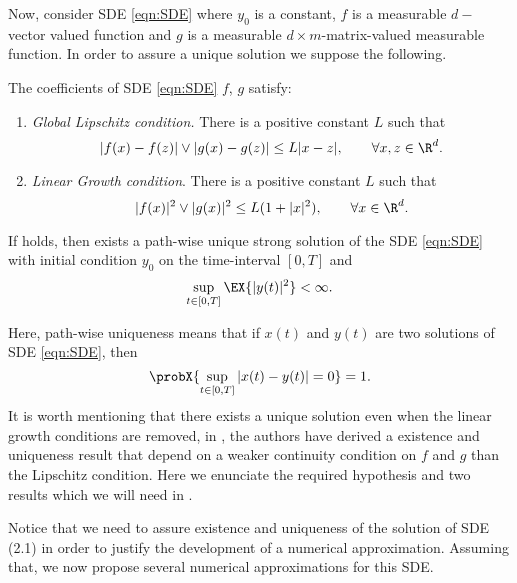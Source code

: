 Now,  consider SDE \eqref{eqn:SDE} where $y_0$ is a constant, $f$ is a measurable
$d-$vector valued function and $g$ is a measurable $d\times m$-matrix-valued measurable function.
In order to assure a unique solution we suppose the following.
\begin{hypothesis}\label{ass:ClassicExisAndUniqueness}
		The coefficients of SDE \eqref{eqn:SDE} $f$, $g$ satisfy: 
	\begin{enumerate}[(EU1)]
		\item \emph{Global Lipschitz condition.}
			There is a positive constant $L$ such that
			$$
				|f(x)-f(z)| \vee |g(x)-g(z)|\leq L|x-z|, \qquad \forall x,z \in \R^d.
			$$
		\item \emph{Linear Growth condition}. There is a positive constant $L$ such that
			$$
				|f(x)|^ 2 \vee |g(x)|^ 2 \leq L(1+|x|^2), \qquad \forall x \in \R^d.
			$$
	\end{enumerate}
\end{hypothesis}
\begin{thm}
	If  holds, then exists a path-wise unique strong solution of the SDE
	\eqref{eqn:SDE} with initial condition $y_0$ on the time-interval $[0, T]$ and
	\begin{equation}
		\sup_{t\in [0,T]} \EX{|y(t)|^2} < \infty.
	\end{equation}
\end{thm}
	Here, path-wise uniqueness means that if $x(t)$ and $y(t)$ are two solutions of SDE \eqref{eqn:SDE}, then
	$$
		\probX{
			\sup_{t\in [0,T]}
				|x(t)-y(t)|=0
			}=1.
	$$
	It is worth mentioning that  there exists a unique solution even when the linear growth conditions are removed, in
\cite{Higham2002b}, the authors have derived a existence and uniqueness result that depend on a weaker
continuity condition on $f$ and $g$ than the Lipschitz condition. Here we enunciate the required hypothesis and two 
results which we will need in .


Notice that we need to  assure  existence and uniqueness of the solution  of  SDE (2.1)  in order to justify the 
development of a numerical approximation.  Assuming that,  we now propose several numerical approximations for  this 
SDE.
